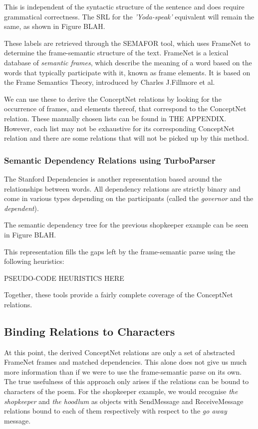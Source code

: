 This is independent of the syntactic structure of the sentence and does require grammatical correctness. The SRL for the \textit{'Yoda-speak'} equivalent will remain the same, as shown in Figure BLAH.

These labels are retrieved through the SEMAFOR tool, which uses FrameNet to determine the frame-semantic structure of the text. FrameNet is a lexical database of \textit{semantic frames}, which describe the meaning of a word based on the words that typically participate with it, known as frame elements. It is based on the Frame Semantics Theory, introduced by Charles J.Fillmore et al.

We can use these to derive the ConceptNet relations by looking for the occurrence of frames, and elements thereof, that correspond to the ConceptNet relation. These manually chosen lists can be found in THE APPENDIX. However, each list may not be exhaustive for its corresponding ConceptNet relation and there are some relations that will not be picked up by this method.


\subsubsection{Semantic Dependency Relations using TurboParser}

The Stanford Dependencies is another representation based around the relationships between words. All dependency relations are strictly binary and come in various types depending on the participants (called the \textit{governor} and the \textit{dependent}).

The semantic dependency tree for the previous shopkeeper example can be seen in Figure BLAH.

This representation fills the gaps left by the frame-semantic parse using the following heuristics:

PSEUDO-CODE HEURISTICS HERE

Together, these tools provide a fairly complete coverage of the ConceptNet relations.


\subsection{Binding Relations to Characters}

At this point, the derived ConceptNet relations are only a set of abstracted FrameNet frames and matched dependencies. This alone does not give us much more information than if we were to use the frame-semantic parse on its own. The true usefulness of this approach only arises if the relations can be bound to characters of the poem. For the shopkeeper example, we would recognise \textit{the shopkeeper} and \textit{the hoodlum} as objects with SendMessage and ReceiveMessage relations bound to each of them respectively with respect to the \textit{go away} message.

